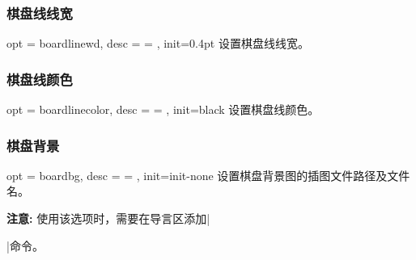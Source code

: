 \documentclass[full]{l3doc}
\begin{document}
\begin{documentation}
\bigskip

\subsubsection{棋盘线线宽}

\begin{option}{ opt = boardlinewd, desc = {= }, init=0.4pt }
  设置棋盘线线宽。
\end{option}

\begin{SideBySideExample}[frame=single,numbers=left,
                xrightmargin=.56\linewidth,gobble=2]
  \centering
  \cchessboard*[boardlinewd=1.0pt]
\end{SideBySideExample}

\bigskip

\subsubsection{棋盘线颜色}

\begin{option}{ opt = boardlinecolor, desc = {= }, init=black }
  设置棋盘线颜色。
\end{option}

\begin{SideBySideExample}[frame=single,numbers=left,
                xrightmargin=.55\linewidth,gobble=2]
  \centering
  \cchessboard*[boardlinecolor=red]
\end{SideBySideExample}

\bigskip

\subsubsection{棋盘背景}

\begin{option}{ opt = boardbg, desc = {= }, init=init-none }
  设置棋盘背景图的插图文件路径及文件名。
\end{option}

  \textbf{\textsf{注意: }}使用该选项时，需要在导言区添加|\usepackage{grpahicx}|命令。

\begin{SideBySideExample}[frame=single,numbers=left,
                xrightmargin=.55\linewidth,gobble=2]
  \centering
  \cchessboard*[boardbg=bg01]\quad
  \cchessboard*[boardbg=bg02]
\end{SideBySideExample}


\end{documentation}
\end{document}
